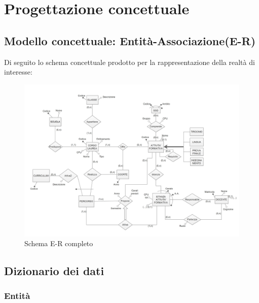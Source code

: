 \documentclass[a4paper,12pt,italian,towside]{article}
\begin{document}
\newpage
\clearpage
\section{Progettazione concettuale}

\subsection{Modello concettuale: Entit\`a-Associazione(E-R)}
Di seguito lo schema concettuale prodotto per la rappresentazione della realt\`a di interesse:

\begin{figure}[!h] %
	\caption{Schema E-R completo}
	\begin{center}
		\includegraphics[scale=0.5,angle=90]{../Schemas/ER_diagram.jpg}
	\end{center}
\end{figure}

\subsection{Dizionario dei dati}

\subsubsection{Entit\`a}
\end{document}

